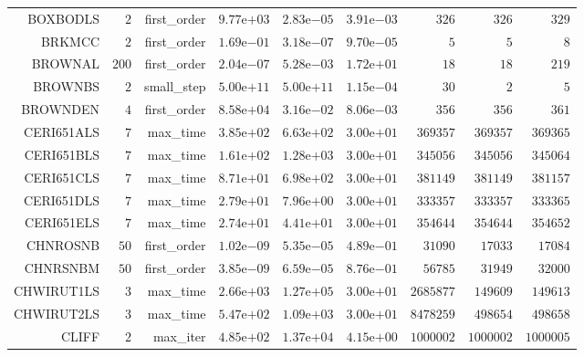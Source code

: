 \begin{longtable}{rrrrrrrrr}
BOXBODLS & \(     2\) & first\_order & \( 9.77\)e\(+03\) & \( 2.83\)e\(-05\) & \( 3.91\)e\(-03\) & \(   326\) & \(   326\) & \(   329\) \\
BRKMCC & \(     2\) & first\_order & \( 1.69\)e\(-01\) & \( 3.18\)e\(-07\) & \( 9.70\)e\(-05\) & \(     5\) & \(     5\) & \(     8\) \\
BROWNAL & \(   200\) & first\_order & \( 2.04\)e\(-07\) & \( 5.28\)e\(-03\) & \( 1.72\)e\(+01\) & \(    18\) & \(    18\) & \(   219\) \\
BROWNBS & \(     2\) & small\_step & \( 5.00\)e\(+11\) & \( 5.00\)e\(+11\) & \( 1.15\)e\(-04\) & \(    30\) & \(     2\) & \(     5\) \\
BROWNDEN & \(     4\) & first\_order & \( 8.58\)e\(+04\) & \( 3.16\)e\(-02\) & \( 8.06\)e\(-03\) & \(   356\) & \(   356\) & \(   361\) \\
CERI651ALS & \(     7\) & max\_time & \( 3.85\)e\(+02\) & \( 6.63\)e\(+02\) & \( 3.00\)e\(+01\) & \(369357\) & \(369357\) & \(369365\) \\
CERI651BLS & \(     7\) & max\_time & \( 1.61\)e\(+02\) & \( 1.28\)e\(+03\) & \( 3.00\)e\(+01\) & \(345056\) & \(345056\) & \(345064\) \\
CERI651CLS & \(     7\) & max\_time & \( 8.71\)e\(+01\) & \( 6.98\)e\(+02\) & \( 3.00\)e\(+01\) & \(381149\) & \(381149\) & \(381157\) \\
CERI651DLS & \(     7\) & max\_time & \( 2.79\)e\(+01\) & \( 7.96\)e\(+00\) & \( 3.00\)e\(+01\) & \(333357\) & \(333357\) & \(333365\) \\
CERI651ELS & \(     7\) & max\_time & \( 2.74\)e\(+01\) & \( 4.41\)e\(+01\) & \( 3.00\)e\(+01\) & \(354644\) & \(354644\) & \(354652\) \\
CHNROSNB & \(    50\) & first\_order & \( 1.02\)e\(-09\) & \( 5.35\)e\(-05\) & \( 4.89\)e\(-01\) & \( 31090\) & \( 17033\) & \( 17084\) \\
CHNRSNBM & \(    50\) & first\_order & \( 3.85\)e\(-09\) & \( 6.59\)e\(-05\) & \( 8.76\)e\(-01\) & \( 56785\) & \( 31949\) & \( 32000\) \\
CHWIRUT1LS & \(     3\) & max\_time & \( 2.66\)e\(+03\) & \( 1.27\)e\(+05\) & \( 3.00\)e\(+01\) & \(2685877\) & \(149609\) & \(149613\) \\
CHWIRUT2LS & \(     3\) & max\_time & \( 5.47\)e\(+02\) & \( 1.09\)e\(+03\) & \( 3.00\)e\(+01\) & \(8478259\) & \(498654\) & \(498658\) \\
CLIFF & \(     2\) & max\_iter & \( 4.85\)e\(+02\) & \( 1.37\)e\(+04\) & \( 4.15\)e\(+00\) & \(1000002\) & \(1000002\) & \(1000005\) \\

\end{longtable}
